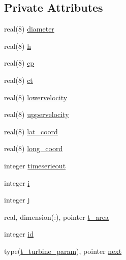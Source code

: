 \subsection*{Private Attributes}
\begin{DoxyCompactItemize}
\item 
real(8) \mbox{\hyperlink{structmoduleturbine_1_1t__turbine__param_a693ea956ea8a968206cfac2ed803cc42}{diameter}}
\item 
real(8) \mbox{\hyperlink{structmoduleturbine_1_1t__turbine__param_aba3cb37b865d02574be2f1e4691e3589}{h}}
\item 
real(8) \mbox{\hyperlink{structmoduleturbine_1_1t__turbine__param_ab84e49db0a408c7f8051a777e839b6ac}{cp}}
\item 
real(8) \mbox{\hyperlink{structmoduleturbine_1_1t__turbine__param_ae958e2ea0f64071783b9cf863c5246c3}{ct}}
\item 
real(8) \mbox{\hyperlink{structmoduleturbine_1_1t__turbine__param_afa8dafad25bccbb643546ffea719350d}{lowervelocity}}
\item 
real(8) \mbox{\hyperlink{structmoduleturbine_1_1t__turbine__param_ab0f5dd72e5d50dd979fc8d4b3a4fdf44}{uppervelocity}}
\item 
real(8) \mbox{\hyperlink{structmoduleturbine_1_1t__turbine__param_a9ff4b6bd1c7f6b68e4e8444859292e2e}{lat\+\_\+coord}}
\item 
real(8) \mbox{\hyperlink{structmoduleturbine_1_1t__turbine__param_aa920ac0bfd01a34cfc6ada7341d13142}{long\+\_\+coord}}
\item 
integer \mbox{\hyperlink{structmoduleturbine_1_1t__turbine__param_afc3d4eb4b122f49dc57287a85da5b635}{timeserieout}}
\item 
integer \mbox{\hyperlink{structmoduleturbine_1_1t__turbine__param_a61d2be7c3f9a387a39adad3009767d31}{i}}
\item 
integer \mbox{\hyperlink{structmoduleturbine_1_1t__turbine__param_a4d3748ef983c6b48982ad9a58dadbbe3}{j}}
\item 
real, dimension(\+:), pointer \mbox{\hyperlink{structmoduleturbine_1_1t__turbine__param_af01a29117c8ef38f16b8de784a1162fe}{t\+\_\+area}}
\item 
integer \mbox{\hyperlink{structmoduleturbine_1_1t__turbine__param_ad8a47c522b8c9721ae587ee9e17b532f}{id}}
\item 
type(\mbox{\hyperlink{structmoduleturbine_1_1t__turbine__param}{t\+\_\+turbine\+\_\+param}}), pointer \mbox{\hyperlink{structmoduleturbine_1_1t__turbine__param_ad1ad9e570d72ccb74fb1e77208e2c626}{next}}
\end{DoxyCompactItemize}


